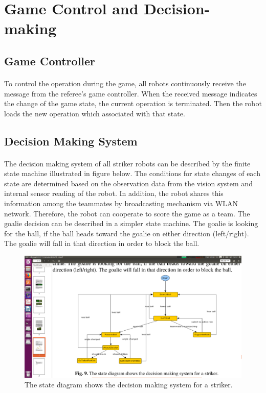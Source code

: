 \section{Game Control and Decision-making}

	\subsection{Game Controller}
	\paragraph{}
	To control the operation during the game, all robots continuously receive the message from the referee’s game controller. When the received message indicates the change of	the game state, the current operation is terminated. Then the robot loads the new operation which associated with that state.
	
	\subsection{Decision Making System}
	\paragraph{}
	The decision making system of all striker robots can be described by the finite state machine illustrated in figure below. The conditions for state changes of each state are determined based on the observation data from the vision system and internal sensor reading of the robot. In addition, the robot shares this information among the teammates
	by broadcasting mechanism via WLAN network. Therefore, the robot can cooperate to score the game as a team. The goalie decision can be described in a simpler state machine. The goalie is looking for the ball, if the ball heads toward the goalie on either direction (left/right). The goalie will fall in that direction in order to block the ball.
	\begin{figure}[H]
		\centering
		\includegraphics[width=\textwidth,trim={15cm 3cm 5cm 5.2cm},clip]{image/stateMachine.png}
		\caption{The state diagram shows the decision making system for a striker.}
		\label{fig:stateMachine}
	\end{figure}